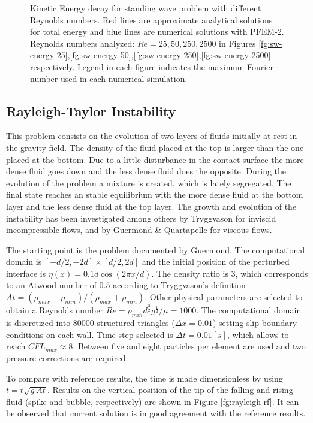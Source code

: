 \documentclass[a4paper,conference]{IEEEtran}
\begin{document}
\begin{figure}
{    }
   \caption{Kinetic Energy decay for standing wave problem with different Reynolds numbers. Red lines are approximate analytical solutions for total energy and blue lines are numerical solutions with PFEM-2. Reynolds numbers analyzed: $Re=25,50,250,2500$ in Figures \ref{fg:sw-energy-25},\ref{fg:sw-energy-50},\ref{fg:sw-energy-250},\ref{fg:sw-energy-2500} respectively. Legend in each figure indicates the maximum Fourier number used in each numerical simulation.}
   \label{fg:sw-energy}
\end{figure}

\subsection{Rayleigh-Taylor Instability}

This problem consists on the evolution of two layers of fluids initially at rest in the gravity field. The density of the fluid placed at the top is larger than the one placed at the bottom. Due to a little disturbance in the contact surface the more dense fluid goes down and the less dense fluid does the opposite. During the evolution of the problem a mixture is created, which is lately segregated. The final state reaches an stable equilibrium with the more dense fluid at the bottom layer and the less dense fluid at the top layer. The growth and evolution of the instability has been investigated among others by Tryggvason\cite{Tryggvason88} for inviscid incompressible flows, and by Guermond \& Quartapelle\cite{Guermond00} for viscous flows.

The starting point is the problem documented by Guermond. The computational domain is $[-d/2,-2d]\times[d/2,2d]$ and the initial position of the perturbed interface is $\eta(x) = 0.1d \cos(2\pi x/d)$. The density ratio is $3$, which corresponds to an Atwood
number of $0.5$ according to Tryggvason's definition $At = (\rho_{max}-\rho_{min})/(\rho_{max}+\rho_{min})$. Other physical parameters are selected to obtain a Reynolds number $Re=\rho_{min}d^{\frac{3}{2}}g^{\frac{1}{2}}/\mu=1000$. The computational domain is discretized into $80000$ structured triangles ($\Delta x=0.01$) setting slip boundary conditions on each wall. Time step selected is $\Delta t=0.01[s]$, which allows to reach $CFL_{max} \approx 8$. Between five and eight particles per element are used and two pressure corrections are required.

To compare with reference results, the time is made dimensionless by using $\widetilde{t} = t\sqrt{g\ At}$. Results on the vertical position of the tip of the falling and rising fluid (spike and bubble, respectively) are shown in Figure \ref{fg:rayleigh-rf}. It can be observed that current solution is in good agreement with the reference results.
\end{document}
